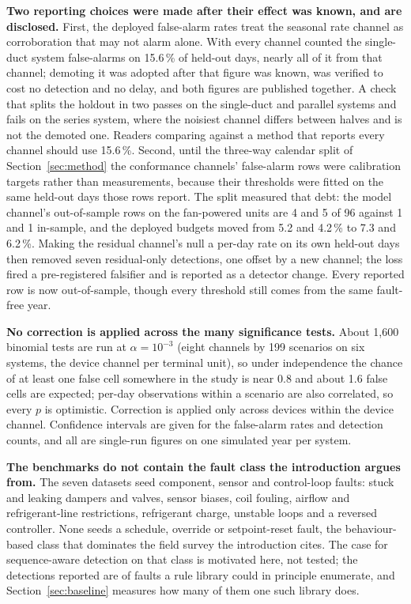 \documentclass[11pt,letterpaper]{article}
\begin{document}
\textbf{Two reporting choices were made after their effect was known, and are disclosed.} First, the deployed false-alarm rates treat the seasonal rate channel as corroboration that may not alarm alone. With every channel counted the single-duct system false-alarms on 15.6\,\% of held-out days, nearly all of it from that channel; demoting it was adopted after that figure was known, was verified to cost no detection and no delay, and both figures are published together. A check that splits the holdout in two passes on the single-duct and parallel systems and fails on the series system, where the noisiest channel differs between halves and is not the demoted one. Readers comparing against a method that reports every channel should use 15.6\,\%. Second, until the three-way calendar split of Section~\ref{sec:method} the conformance channels' false-alarm rows were calibration targets rather than measurements, because their thresholds were fitted on the same held-out days those rows report. The split measured that debt: the model channel's out-of-sample rows on the fan-powered units are 4 and 5 of 96 against 1 and 1 in-sample, and the deployed budgets moved from 5.2 and 4.2\,\% to 7.3 and 6.2\,\%. Making the residual channel's null a per-day rate on its own held-out days then removed seven residual-only detections, one offset by a new channel; the loss fired a pre-registered falsifier and is reported as a detector change. Every reported row is now out-of-sample, though every threshold still comes from the same fault-free year.

\textbf{No correction is applied across the many significance tests.} About 1{,}600 binomial tests are run at $\alpha = 10^{-3}$ (eight channels by 199 scenarios on six systems, the device channel per terminal unit), so under independence the chance of at least one false cell somewhere in the study is near 0.8 and about 1.6 false cells are expected; per-day observations within a scenario are also correlated, so every $p$ is optimistic. Correction is applied only across devices within the device channel. Confidence intervals are given for the false-alarm rates and detection counts, and all are single-run figures on one simulated year per system.

\textbf{The benchmarks do not contain the fault class the introduction argues from.} The seven datasets seed component, sensor and control-loop faults: stuck and leaking dampers and valves, sensor biases, coil fouling, airflow and refrigerant-line restrictions, refrigerant charge, unstable loops and a reversed controller. None seeds a schedule, override or setpoint-reset fault, the behaviour-based class that dominates the field survey the introduction cites. The case for sequence-aware detection on that class is motivated here, not tested; the detections reported are of faults a rule library could in principle enumerate, and Section~\ref{sec:baseline} measures how many of them one such library does.
\end{document}
